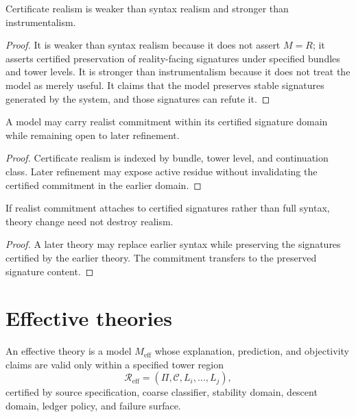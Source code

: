 \begin{theorem}
\label{thm:certificate-realism-between}
Certificate realism is weaker than syntax realism and stronger than instrumentalism.
\end{theorem}

\begin{proof}
It is weaker than syntax realism because it does not assert $M=R$; it asserts certified preservation of reality-facing signatures under specified bundles and tower levels. It is stronger than instrumentalism because it does not treat the model as merely useful. It claims that the model preserves stable signatures generated by the system, and those signatures can refute it.
\end{proof}

\begin{corollary}
\label{cor:realism-domain-local}
A model may carry realist commitment within its certified signature domain while remaining open to later refinement.
\end{corollary}

\begin{proof}
Certificate realism is indexed by bundle, tower level, and continuation class. Later refinement may expose active residue without invalidating the certified commitment in the earlier domain.
\end{proof}

\begin{corollary}
\label{cor:theory-change-compatible-realism}
If realist commitment attaches to certified signatures rather than full syntax, theory change need not destroy realism.
\end{corollary}

\begin{proof}
A later theory may replace earlier syntax while preserving the signatures certified by the earlier theory. The commitment transfers to the preserved signature content.
\end{proof}

\section{Effective theories}
\label{sec:effective-theories-methodology}

\begin{definition}
\label{def:effective-theory-methodological}
An effective theory is a model $M_{\mathrm{eff}}$ whose explanation, prediction, and objectivity claims are valid only within a specified tower region
$$
\mathcal R_{\mathrm{eff}}
=
(\Pi,\mathcal C,L_i,\ldots,L_j),
$$
certified by source specification, coarse classifier, stability domain, descent domain, ledger policy, and failure surface.
\end{definition}

